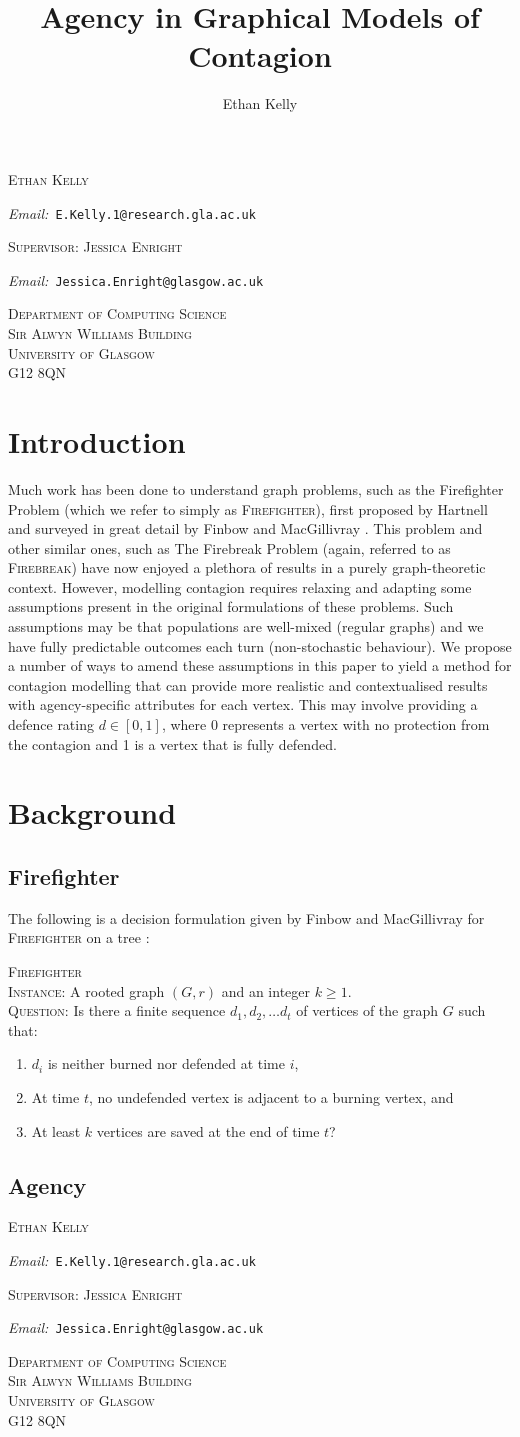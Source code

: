 \documentclass[11pt]{amsart}
\title{Agency in Graphical Models of Contagion}
\author{Ethan Kelly}
\makeatletter
\DeclareRobustCommand{\subtitle}[1]{\\#1}
\newcommand{\Addresses}{{
  \bigskip
  \footnotesize
  \textsc{Ethan Kelly} \par\nopagebreak
  	\hspace{\parindent}\textit{Email:~}\texttt{E.Kelly.1@research.gla.ac.uk}\par\nopagebreak
	\vspace{1mm}
  \textsc{Supervisor: Jessica Enright}\par\nopagebreak
  	\hspace{\parindent}\textit{Email:~}\texttt{Jessica.Enright@glasgow.ac.uk}\par\nopagebreak
	\vspace{1mm}
	\begin{flushright}
  \textsc{Department of Computing Science\\Sir Alwyn Williams Building\\University of Glasgow\\G12 8QN}
  \end{flushright}
}}
\makeatother
\begin{document}
\maketitle
\renewcommand{\subtitle}[1]{}
\Addresses

\section{Introduction}
\label{sec:intro}
Much work has been done to understand graph problems, such as the Firefighter Problem (which we refer to simply as {\scshape Firefighter}), first proposed by Hartnell \cite{hartnell95} and surveyed in great detail by Finbow and MacGillivray \cite{finbow09}. This problem and other similar ones, such as The Firebreak Problem (again, referred to as {\scshape Firebreak}) have now enjoyed a plethora of results in a purely graph-theoretic context. However, modelling contagion requires relaxing and adapting some assumptions present in the original formulations of these problems. Such assumptions may be that populations are well-mixed (regular graphs) and we have fully predictable outcomes each turn (non-stochastic behaviour). We propose a number of ways to amend these assumptions in this paper to yield a method for contagion modelling that can provide more realistic and contextualised results with agency-specific attributes for each vertex. This may involve providing a defence rating $d\in[0,1]$, where 0 represents a vertex with no protection from the contagion and 1 is a vertex that is fully defended. 


\section{Background}

\subsection{Firefighter}
\label{sec:fire}


The following is a decision formulation given by Finbow and MacGillivray for {\scshape Firefighter} on a tree \cite{finbow09}:

{\scshape Firefighter}\\ \indent
{\scshape Instance:} A rooted graph $(G,r)$ and an integer $k\geq 1$.\\ \indent
{\scshape Question:} Is there a finite sequence $d_1, d_2,\dots d_t$ of vertices of the graph $G$ such that:
	\begin{enumerate}[label=\roman*]
		\item $d_i$ {is neither burned nor defended at time} $i$,
		\item {At time} $t$, no undefended vertex is adjacent to a burning vertex, and
		\item {At least} $k$ {vertices are saved at the end of time} $t$?
	\end{enumerate}



\subsection{Agency}
\label{sec:agent}


\newpage



\nocite{*}

\Addresses
\end{document}
